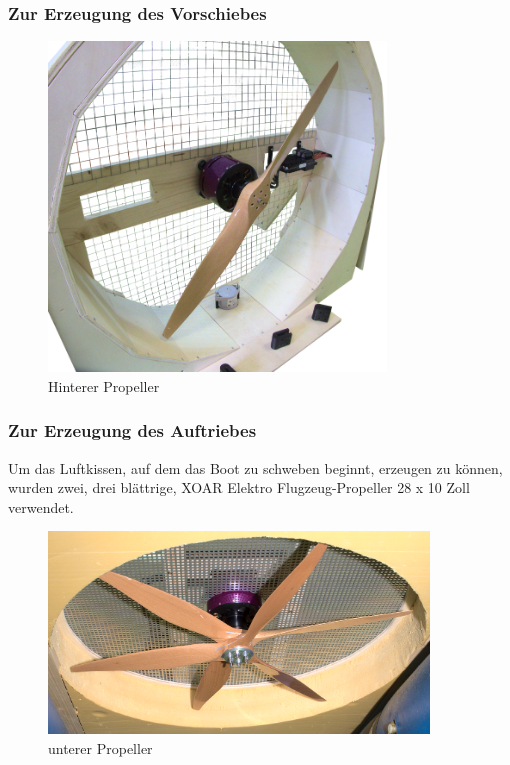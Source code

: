 \subsubsection{Zur Erzeugung des Vorschiebes}

\begin{figure}[h]
    \centering
    \includegraphics[width=0.8\textwidth]{Fotos/Propeller_Hinten.png}
    \caption{Hinterer Propeller}
\end{figure}

\newpage
\subsubsection{Zur Erzeugung des Auftriebes}
Um das Luftkissen, auf dem das Boot zu schweben beginnt, erzeugen zu können, wurden zwei, drei blättrige, XOAR Elektro Flugzeug-Propeller 28 x 10 Zoll verwendet.  
\begin{figure}[h]
    \centering
    \includegraphics[width=0.9\textwidth]{Fotos/Propeller_unten.png}
    \caption{unterer Propeller}
\end{figure}

